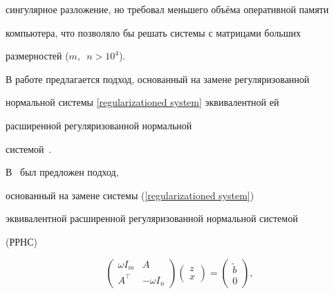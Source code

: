 сингулярное разложение, но требовал меньшего объёма оперативной памяти

компьютера, что позволяло бы решать системы с матрицами больших

размерностей ($m,$~$ n > 10^4$).



В работе предлагается подход, основанный на замене регуляризованной

нормальной системы \eqref{regularizationed system} эквивалентной ей

расширенной регуляризованной нормальной

системой~{\cite{dolishzhdanov:bib:zhdanov}}.



\smallskip




В~{\cite{dolishzhdanov:bib:zhdanov}} был предложен подход,

основанный на замене системы (\ref{regularizationed system})

эквивалентной расширенной регуляризованной нормальной системой

(РРНС)

\begin{equation}

\label{extended system} \left(

\begin{array}{cc}

{\omega I_m} & A \\ A^\top    & {-\omega I_n}

\end{array}

\right) \left(

\begin{array}{c}

z \\ x

\end{array}

\right) = \left(

\begin{array}{c}

{\widetilde{b}} \\ 0

\end{array}

\right),

\end{equation}

